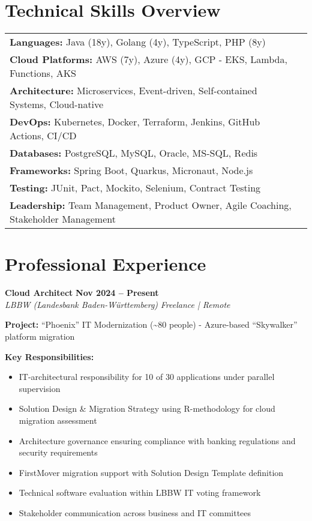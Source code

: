 \documentclass[11pt,a4paper]{article}
\newcommand{\jobheader}[4]{%
    \textbf{\large #1} \hfill \textbf{#2} \\
    \textit{#3} \hfill \textit{#4}
}
\newcommand{\skill}[2]{%
    \textbf{#1:} #2
}
\begin{document}
\section{Technical Skills Overview}

\begin{tabularx}{\textwidth}{p{3.5cm}X}
\skill{Languages}{Java (18y), Golang (4y), TypeScript, PHP (8y)} \\
\skill{Cloud Platforms}{AWS (7y), Azure (4y), GCP - EKS, Lambda, Functions, AKS} \\
\skill{Architecture}{Microservices, Event-driven, Self-contained Systems, Cloud-native} \\
\skill{DevOps}{Kubernetes, Docker, Terraform, Jenkins, GitHub Actions, CI/CD} \\
\skill{Databases}{PostgreSQL, MySQL, Oracle, MS-SQL, Redis} \\
\skill{Frameworks}{Spring Boot, Quarkus, Micronaut, Node.js} \\
\skill{Testing}{JUnit, Pact, Mockito, Selenium, Contract Testing} \\
\skill{Leadership}{Team Management, Product Owner, Agile Coaching, Stakeholder Management}
\end{tabularx}

\newpage

\section{Professional Experience}

\jobheader{Cloud Architect}{Nov 2024 -- Present}{LBBW (Landesbank Baden-Württemberg)}{Freelance | Remote}

\textbf{Project:} ``Phoenix'' IT Modernization (\textasciitilde 80 people) - Azure-based ``Skywalker'' platform migration

\textbf{Key Responsibilities:}
\begin{itemize}[leftmargin=*,noitemsep,topsep=0pt]
\item IT-architectural responsibility for 10 of 30 applications under parallel supervision
\item Solution Design \& Migration Strategy using R-methodology for cloud migration assessment
\item Architecture governance ensuring compliance with banking regulations and security requirements
\item FirstMover migration support with Solution Design Template definition
\item Technical software evaluation within LBBW IT voting framework
\item Stakeholder communication across business and IT committees
\end{itemize}
\end{document}
